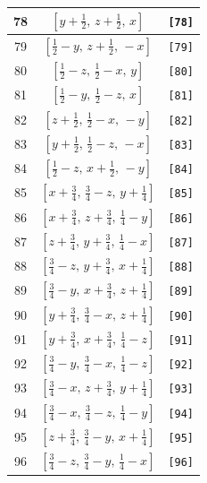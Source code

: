 \documentclass[fleqn,8pt]{jsarticle}
\begin{document}
\begin{longtable}{ccc}
78 & $\left[ y + \frac{1}{2},\, z + \frac{1}{2},\, x \right]$ & {\tt [78]} \\ \hline
79 & $\left[ \frac{1}{2} - y,\, z + \frac{1}{2},\, - x \right]$ & {\tt [79]} \\ \hline
80 & $\left[ \frac{1}{2} - z,\, \frac{1}{2} - x,\, y \right]$ & {\tt [80]} \\ \hline
81 & $\left[ \frac{1}{2} - y,\, \frac{1}{2} - z,\, x \right]$ & {\tt [81]} \\ \hline
82 & $\left[ z + \frac{1}{2},\, \frac{1}{2} - x,\, - y \right]$ & {\tt [82]} \\ \hline
83 & $\left[ y + \frac{1}{2},\, \frac{1}{2} - z,\, - x \right]$ & {\tt [83]} \\ \hline
84 & $\left[ \frac{1}{2} - z,\, x + \frac{1}{2},\, - y \right]$ & {\tt [84]} \\ \hline
85 & $\left[ x + \frac{3}{4},\, \frac{3}{4} - z,\, y + \frac{1}{4} \right]$ & {\tt [85]} \\ \hline
86 & $\left[ x + \frac{3}{4},\, z + \frac{3}{4},\, \frac{1}{4} - y \right]$ & {\tt [86]} \\ \hline
87 & $\left[ z + \frac{3}{4},\, y + \frac{3}{4},\, \frac{1}{4} - x \right]$ & {\tt [87]} \\ \hline
88 & $\left[ \frac{3}{4} - z,\, y + \frac{3}{4},\, x + \frac{1}{4} \right]$ & {\tt [88]} \\ \hline
89 & $\left[ \frac{3}{4} - y,\, x + \frac{3}{4},\, z + \frac{1}{4} \right]$ & {\tt [89]} \\ \hline
90 & $\left[ y + \frac{3}{4},\, \frac{3}{4} - x,\, z + \frac{1}{4} \right]$ & {\tt [90]} \\ \hline
91 & $\left[ y + \frac{3}{4},\, x + \frac{3}{4},\, \frac{1}{4} - z \right]$ & {\tt [91]} \\ \hline
92 & $\left[ \frac{3}{4} - y,\, \frac{3}{4} - x,\, \frac{1}{4} - z \right]$ & {\tt [92]} \\ \hline
93 & $\left[ \frac{3}{4} - x,\, z + \frac{3}{4},\, y + \frac{1}{4} \right]$ & {\tt [93]} \\ \hline
94 & $\left[ \frac{3}{4} - x,\, \frac{3}{4} - z,\, \frac{1}{4} - y \right]$ & {\tt [94]} \\ \hline
95 & $\left[ z + \frac{3}{4},\, \frac{3}{4} - y,\, x + \frac{1}{4} \right]$ & {\tt [95]} \\ \hline
96 & $\left[ \frac{3}{4} - z,\, \frac{3}{4} - y,\, \frac{1}{4} - x \right]$ & {\tt [96]} \\
\end{longtable}
\end{document}
